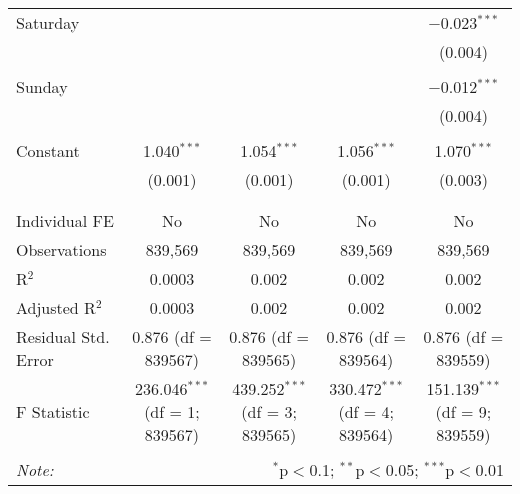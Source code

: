 \documentclass[
]{article}
\begin{document}
\begin{table}[!htbp]
{\begin{tabular}{@{\extracolsep{5pt}}lcccc}
 Saturday &  &  &  & $-$0.023$^{***}$ \\ 
  &  &  &  & (0.004) \\ 
  & & & & \\ 
 Sunday &  &  &  & $-$0.012$^{***}$ \\ 
  &  &  &  & (0.004) \\ 
  & & & & \\ 
 Constant & 1.040$^{***}$ & 1.054$^{***}$ & 1.056$^{***}$ & 1.070$^{***}$ \\ 
  & (0.001) & (0.001) & (0.001) & (0.003) \\ 
  & & & & \\ 
\hline \\[-1.8ex] 
Individual FE & No & No & No & No \\ 
Observations & 839,569 & 839,569 & 839,569 & 839,569 \\ 
R$^{2}$ & 0.0003 & 0.002 & 0.002 & 0.002 \\ 
Adjusted R$^{2}$ & 0.0003 & 0.002 & 0.002 & 0.002 \\ 
Residual Std. Error & 0.876 (df = 839567) & 0.876 (df = 839565) & 0.876 (df = 839564) & 0.876 (df = 839559) \\ 
F Statistic & 236.046$^{***}$ (df = 1; 839567) & 439.252$^{***}$ (df = 3; 839565) & 330.472$^{***}$ (df = 4; 839564) & 151.139$^{***}$ (df = 9; 839559) \\ 
\hline 
\hline \\[-1.8ex] 
\textit{Note:}  & \multicolumn{4}{r}{$^{*}$p$<$0.1; $^{**}$p$<$0.05; $^{***}$p$<$0.01} \\ 
\end{tabular}
} 
\end{table} 
\newpage
\end{document}

